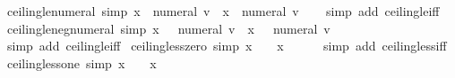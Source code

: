 \begin{isabellebody}
\endisatagproof
{\isafoldproof}%
%
\isadelimproof
\isanewline
%
\endisadelimproof
\isanewline
{}\isamarkupfalse%
\ ceiling{\isacharunderscore}{\kern0pt}le{\isacharunderscore}{\kern0pt}numeral\ {\isacharbrackleft}{\kern0pt}simp{\isacharbrackright}{\kern0pt}{\isacharcolon}{\kern0pt}\ {\isachardoublequoteopen}{\isasymlceil}x{\isasymrceil}\ {\isasymle}\ numeral\ v\ {\isasymlongleftrightarrow}\ x\ {\isasymle}\ numeral\ v{\isachardoublequoteclose}\isanewline
%
\isadelimproof
\ \ %
\endisadelimproof
%
\isatagproof
{}\isamarkupfalse%
\ {\isacharparenleft}{\kern0pt}simp\ add{\isacharcolon}{\kern0pt}\ ceiling{\isacharunderscore}{\kern0pt}le{\isacharunderscore}{\kern0pt}iff{\isacharparenright}{\kern0pt}%
\endisatagproof
{\isafoldproof}%
%
\isadelimproof
\isanewline
%
\endisadelimproof
\isanewline
{}\isamarkupfalse%
\ ceiling{\isacharunderscore}{\kern0pt}le{\isacharunderscore}{\kern0pt}neg{\isacharunderscore}{\kern0pt}numeral\ {\isacharbrackleft}{\kern0pt}simp{\isacharbrackright}{\kern0pt}{\isacharcolon}{\kern0pt}\ {\isachardoublequoteopen}{\isasymlceil}x{\isasymrceil}\ {\isasymle}\ {\isacharminus}{\kern0pt}\ numeral\ v\ {\isasymlongleftrightarrow}\ x\ {\isasymle}\ {\isacharminus}{\kern0pt}\ numeral\ v{\isachardoublequoteclose}\isanewline
%
\isadelimproof
\ \ %
\endisadelimproof
%
\isatagproof
{}\isamarkupfalse%
\ {\isacharparenleft}{\kern0pt}simp\ add{\isacharcolon}{\kern0pt}\ ceiling{\isacharunderscore}{\kern0pt}le{\isacharunderscore}{\kern0pt}iff{\isacharparenright}{\kern0pt}%
\endisatagproof
{\isafoldproof}%
%
\isadelimproof
\isanewline
%
\endisadelimproof
\isanewline
{}\isamarkupfalse%
\ ceiling{\isacharunderscore}{\kern0pt}less{\isacharunderscore}{\kern0pt}zero\ {\isacharbrackleft}{\kern0pt}simp{\isacharbrackright}{\kern0pt}{\isacharcolon}{\kern0pt}\ {\isachardoublequoteopen}{\isasymlceil}x{\isasymrceil}\ {\isacharless}{\kern0pt}\ {}\ {\isasymlongleftrightarrow}\ x\ {\isasymle}\ {\isacharminus}{\kern0pt}{}{\isachardoublequoteclose}\isanewline
%
\isadelimproof
\ \ %
\endisadelimproof
%
\isatagproof
{}\isamarkupfalse%
\ {\isacharparenleft}{\kern0pt}simp\ add{\isacharcolon}{\kern0pt}\ ceiling{\isacharunderscore}{\kern0pt}less{\isacharunderscore}{\kern0pt}iff{\isacharparenright}{\kern0pt}%
\endisatagproof
{\isafoldproof}%
%
\isadelimproof
\isanewline
%
\endisadelimproof
\isanewline
{}\isamarkupfalse%
\ ceiling{\isacharunderscore}{\kern0pt}less{\isacharunderscore}{\kern0pt}one\ {\isacharbrackleft}{\kern0pt}simp{\isacharbrackright}{\kern0pt}{\isacharcolon}{\kern0pt}\ {\isachardoublequoteopen}{\isasymlceil}x{\isasymrceil}\ {\isacharless}{\kern0pt}\ {}\ {\isasymlongleftrightarrow}\ x\ {\isasymle}\ {}{\isachardoublequoteclose}\isanewline

\end{isabellebody}

